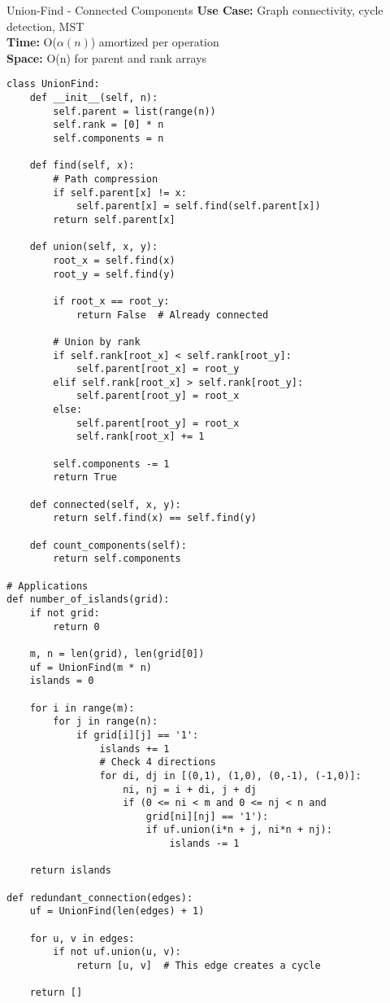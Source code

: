 \documentclass[10pt,a4paper]{article}
\begin{document}
\begin{patternbox}{Union-Find - Connected Components}
\textbf{Use Case:} Graph connectivity, cycle detection, MST\\
\textbf{Time:} O($\alpha(n)$) amortized per operation\\
\textbf{Space:} O(n) for parent and rank arrays
\end{patternbox}

\begin{lstlisting}
class UnionFind:
    def __init__(self, n):
        self.parent = list(range(n))
        self.rank = [0] * n
        self.components = n

    def find(self, x):
        # Path compression
        if self.parent[x] != x:
            self.parent[x] = self.find(self.parent[x])
        return self.parent[x]

    def union(self, x, y):
        root_x = self.find(x)
        root_y = self.find(y)

        if root_x == root_y:
            return False  # Already connected

        # Union by rank
        if self.rank[root_x] < self.rank[root_y]:
            self.parent[root_x] = root_y
        elif self.rank[root_x] > self.rank[root_y]:
            self.parent[root_y] = root_x
        else:
            self.parent[root_y] = root_x
            self.rank[root_x] += 1

        self.components -= 1
        return True

    def connected(self, x, y):
        return self.find(x) == self.find(y)

    def count_components(self):
        return self.components

# Applications
def number_of_islands(grid):
    if not grid:
        return 0

    m, n = len(grid), len(grid[0])
    uf = UnionFind(m * n)
    islands = 0

    for i in range(m):
        for j in range(n):
            if grid[i][j] == '1':
                islands += 1
                # Check 4 directions
                for di, dj in [(0,1), (1,0), (0,-1), (-1,0)]:
                    ni, nj = i + di, j + dj
                    if (0 <= ni < m and 0 <= nj < n and
                        grid[ni][nj] == '1'):
                        if uf.union(i*n + j, ni*n + nj):
                            islands -= 1

    return islands

def redundant_connection(edges):
    uf = UnionFind(len(edges) + 1)

    for u, v in edges:
        if not uf.union(u, v):
            return [u, v]  # This edge creates a cycle

    return []
\end{lstlisting}
\end{document}
